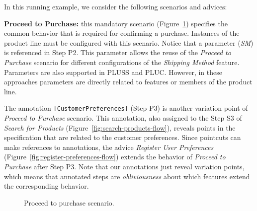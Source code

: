 In this running example, we consider the following scenarios and advices:

{\bf Proceed to Purchase:} this mandatory scenario
(Figure~\ref{fig:proceed-to-checkout}) specifies the common behavior that is
required for confirming a purchase. Instances of the product line must be
configured with this scenario. 
Notice that a parameter (\emph{SM}) is referenced in Step P2. 
This parameter allows the reuse of the \emph{Proceed to
Purchase} scenario for different configurations of the \emph{Shipping Method} feature. {\color{red} Parameters 
are also supported in PLUSS and PLUC. However, in these approaches parameters are directly related to features or members of the product line.}

{\color{red} The annotation \mbox{\texttt{[CustomerPreferences]}} (Step P3) is
another variation point of \emph{Proceed to Purchase} scenario. This annotation, also assigned to the Step S3 of \emph{Search for Products} (Figure~\ref{fig:search-products-flow}), reveals points in the specification that are related to the customer preferences. Since pointcuts can make references to annotations, the advice \emph{Register User Preferences} (Figure~\ref{fig:register-preferences-flow}) extends the behavior of \emph{Proceed to Purchase} after Step P3. Note that our annotations just reveal variation points, which means that annotated steps are \emph{obliviousness} about which features extend the corresponding behavior. }


\begin{figure}[h]
\caption{Proceed to purchase scenario.}
\label{fig:proceed-to-checkout}
\end{figure}

